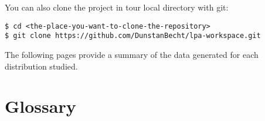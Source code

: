 \begin{appendix}
You can also clone the project in tour local directory with git:

\begin{tcolorbox}[width=\linewidth, title=shell]
\begin{verbatim}
$ cd <the-place-you-want-to-clone-the-repository>
$ git clone https://github.com/DunstanBecht/lpa-workspace.git
\end{verbatim}
\end{tcolorbox}

\bigskip

The following pages provide a summary of the data generated for each distribution studied.

\newpage

\begin{multicols}{2}



\null

\end{multicols}

\section{Glossary}

\printnoidxglossaries

\newpage

\printbibliography[heading=bibintoc, heading=bibnumbered]

\end{appendix}
